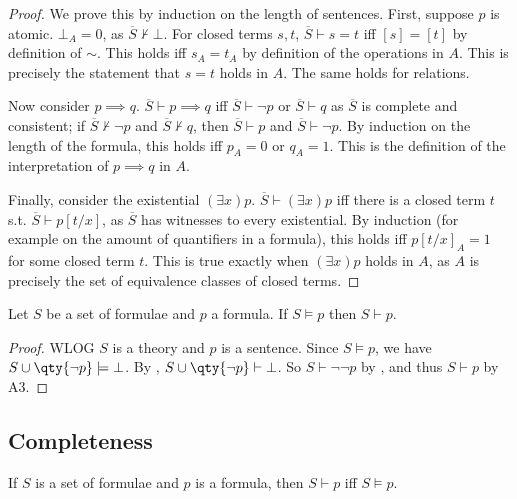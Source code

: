 \begin{proof}
    We prove this by induction on the length of sentences.
    First, suppose $p$ is atomic.
    $\bot_A = 0$, as $\overline S \not\vdash \bot$.
    For closed terms $s, t$, $\overline S \vdash s = t$ iff $[s] = [t]$ by definition of $\sim$.
    This holds iff $s_A = t_A$ by definition of the operations in $A$.
    This is precisely the statement that $s = t$ holds in $A$.
    The same holds for relations.

    Now consider $p \implies q$.
    $\overline S \vdash p \implies q$ iff $\overline S \vdash \neg p$ or $\overline S \vdash q$ as $\overline S$ is complete and consistent; if $\overline S \not\vdash \neg p$ and $\overline S \not\vdash q$, then $\overline S \vdash p$ and $\overline S \vdash \neg p$.
    By induction on the length of the formula, this holds iff $p_A = 0$ or $q_A = 1$.
    This is the definition of the interpretation of $p \implies q$ in $A$.

    Finally, consider the existential $(\exists x)p$.
    $\overline S \vdash (\exists x)p$ iff there is a closed term $t$ s.t. $\overline S \vdash p[t/x]$, as $\overline S$ has witnesses to every existential.
    By induction (for example on the amount of quantifiers in a formula), this holds iff $p[t/x]_A = 1$ for some closed term $t$.
    This is true exactly when $(\exists x)p$ holds in $A$, as $A$ is precisely the set of equivalence classes of closed terms.
\end{proof}

\begin{corollary}[Adequacy]
    Let $S$ be a set of formulae and $p$ a formula.
    If $S \models p$ then $S \vdash p$.
\end{corollary}

\begin{proof}
    WLOG $S$ is a theory and $p$ is a sentence.
    Since $S \models p$, we have $S \cup \qty{\neg p} \models \bot$.
    By , $S \cup \qty{\neg p} \vdash \bot$.
    So $S \vdash \neg \neg p$ by , and thus $S \vdash p$ by A3.
\end{proof}

\subsection{Completeness}
\begin{theorem}
    If $S$ is a set of formulae and $p$ is a formula, then $S \vdash p$ iff $S \models p$.
\end{theorem}

